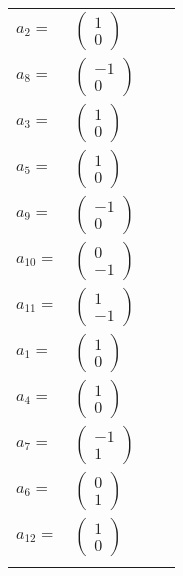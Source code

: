 \documentclass[1p]{elsarticle_modified}
\theoremstyle{definition}
\begin{document}
\begin{tabular}{m{7pt} m{180pt} m{7pt} m{180pt} }
\flushright $a_{2}=$&$\begin{pmatrix}1\\0\end{pmatrix}$ \\
\flushright $a_{8}=$&$\begin{pmatrix}-1\\0\end{pmatrix}$ \\
\flushright $a_{3}=$&$\begin{pmatrix}1\\0\end{pmatrix}$ \\
\flushright $a_{5}=$&$\begin{pmatrix}1\\0\end{pmatrix}$ \\
\flushright $a_{9}=$&$\begin{pmatrix}-1\\0\end{pmatrix}$ \\
\flushright $a_{10}=$&$\begin{pmatrix}0\\-1\end{pmatrix}$ \\
\flushright $a_{11}=$&$\begin{pmatrix}1\\-1\end{pmatrix}$ \\
\flushright $a_{1}=$&$\begin{pmatrix}1\\0\end{pmatrix}$ \\
\flushright $a_{4}=$&$\begin{pmatrix}1\\0\end{pmatrix}$ \\
\flushright $a_{7}=$&$\begin{pmatrix}-1\\1\end{pmatrix}$ \\
\flushright $a_{6}=$&$\begin{pmatrix}0\\1\end{pmatrix}$ \\
\flushright $a_{12}=$&$\begin{pmatrix}1\\0\end{pmatrix}$\\&\end{tabular}
\end{document}
